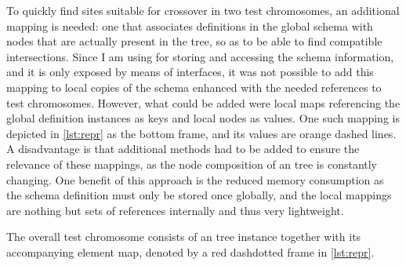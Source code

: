To quickly find sites suitable for crossover in two test chromosomes, an additional mapping is needed: 
one that associates definitions in the global schema with nodes that are actually present in the \xml tree, so 
as to be able to find compatible intersections.
Since I am using \xerces for storing and accessing the schema information, and it is only exposed by means of 
\java interfaces, it was not possible to add this mapping to local copies of the schema  
enhanced with the needed references to test chromosomes. However, what could be added were local 
maps referencing the global definition instances as keys and local nodes as values. One such mapping is depicted
in \cref{lst:repr} as the bottom frame, and its values are orange dashed lines. A disadvantage is that
additional methods had to be added to ensure the relevance of these mappings, as the node composition of an
\xml tree is constantly changing. One benefit of this approach is the reduced memory consumption as the schema
definition must only be stored once globally, and the local mappings are nothing but sets of references 
internally and thus very lightweight. 

The overall \xml test chromosome consists of an \xml tree instance together with its accompanying element map,
denoted by a red dashdotted frame in \cref{lst:repr}.

